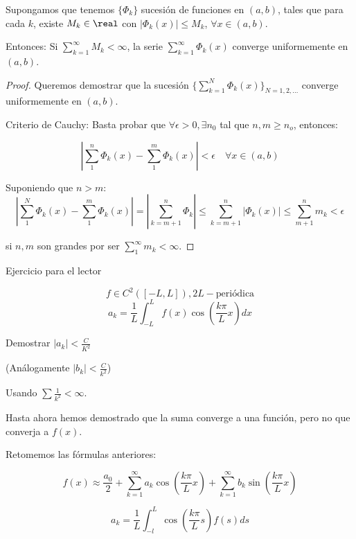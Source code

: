 		\begin{defn}\label{defn:criterio_Weierstrass}

			Supongamos que tenemos $\{\Phi_k\}$ sucesión de funciones en $(a,b)$, tales que para cada $k$, existe $M_k \in \real$ con $|\Phi_k(x)| \leq M_k$, $\forall x \in (a,b)$.

			Entonces: Si $\sum\limits_{k=1}^{\infty} M_k < \infty$, la serie $\sum\limits_{k=1}^{\infty} \Phi_k(x) $ converge uniformemente en $(a,b)$.


			\begin{proof}
				Queremos demostrar que la sucesión $\{\sum\limits_{k=1}^{N} \Phi_k(x)\}_{N=1,2,…} $ converge uniformemente en $(a,b)$.

				Criterio de Cauchy: Basta probar que $\forall \epsilon > 0, \exists n_0 $ tal que $n,m \geq n_o $, entonces:

				\[ | \sum^n_1 \Phi_k(x) - \sum^m_1 \Phi_k(x) | < \epsilon \quad \forall x \in (a,b) \]

				Suponiendo que $n > m$:
				\[| \sum^{N}_1 \Phi_k (x) - \sum^{m}_1 \Phi_k (x) | = | \sum^n_{k=m+1} \Phi_k | \leq \sum^n_{k=m+1} | \Phi_k (x) | \leq \sum_{m+1}^n m_k < \epsilon \]

				si $n,m$ son grandes por ser  $\sum\limits_{1}^{\infty} m_k < \infty $.

			\end{proof}
		\end{defn}

		\begin{example}{Ejercicio para el lector}

			\[ f \in C^2 ([-L,L]), 2L-\text{periódica}\]
			\[ a_k = \frac{1}{L} \int^{L}_{-L} f(x) \cos \left( \frac{k \pi}{L} x \right) dx \]

			Demostrar $|a_k| < \frac{C}{K^2}$

			(Análogamente $|b_k| < \frac{C}{k^2}$)

			Usando $\sum \frac{1}{k^2} < \infty$.
		\end{example}

		\obs Hasta ahora hemos demostrado que la suma converge a una función, pero no que converja a $f(x)$.

		Retomemos las fórmulas anteriores:

		\[ f(x) ≈ \frac{a_0}{2} + \sum_{k=1}^\infty a_k \cos \left( \frac{k \pi}{L} x \right) + \sum_{k=1}^\infty b_k \sin \left( \frac{k \pi}{L} x \right) \]

		\[a_k = \frac{1}{L} \int_{-l}^L \cos \left( \frac{k \pi}{L} s \right) f(s) ds \]

